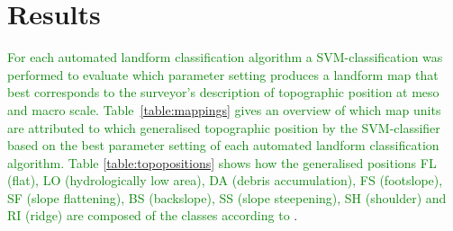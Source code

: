 \documentclass[preprint,12pt,authoryear]{elsarticle}
\begin{document}
\section{Results}
\textcolor{green}{For each automated landform classification algorithm a SVM-classification was performed to evaluate which parameter setting produces a landform map that best corresponds to the surveyor's description of topographic position at meso and macro scale.  Table~}\ref{table:mappings} \textcolor{green}{gives an overview of which map units are attributed to which generalised  topographic position by the SVM-classifier based on the best parameter setting of each automated landform classification algorithm. Table} \ref{table:topopositions} \textcolor{green}{shows how the generalised positions  FL (flat), LO (hydrologically low area), DA (debris accumulation), FS (footslope), SF (slope flattening), BS (backslope), SS (slope steepening), SH (shoulder) and RI (ridge) are composed of the classes  according to} \cite{Englisch1998}.
\end{document}
